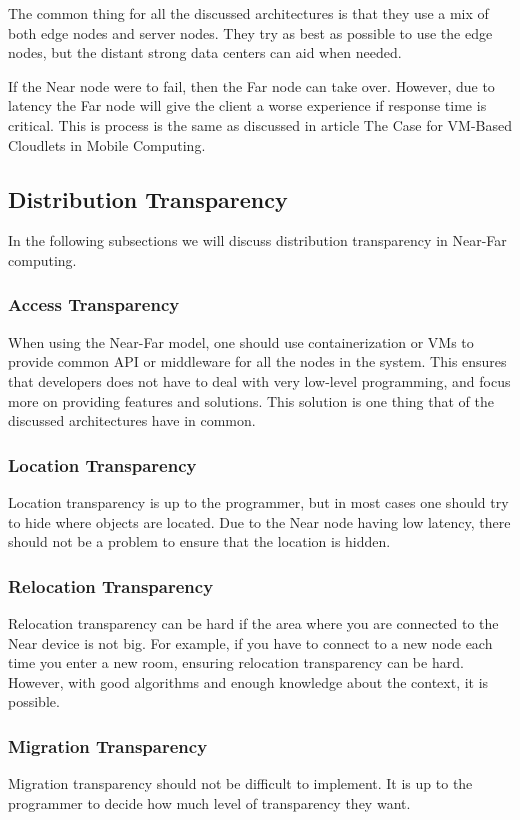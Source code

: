 The common thing for all the discussed architectures is that they use a mix of both edge nodes and server nodes. They try as best as possible to use the edge nodes, but the distant strong data centers can aid when needed. 

If the Near node were to fail, then the Far node can take over. However, due to latency the Far node will give the client a worse experience if response time is critical. This is process is the same as discussed in article The Case for VM-Based Cloudlets in Mobile Computing\cite{satyanarayanan_case_2009}.

\subsection{Distribution Transparency}
In the following subsections we will discuss distribution transparency in Near-Far computing.

\subsubsection{Access Transparency}
When using the Near-Far model, one should use containerization or VMs to provide common API or middleware for all the nodes in the system. This ensures that developers does not have to deal with very low-level programming, and focus more on providing features and solutions. This solution is one thing that of the discussed architectures have in common.

\subsubsection{Location Transparency}
Location transparency is up to the programmer, but in most cases one should try to hide where objects are located. Due to the Near node having low latency, there should not be a problem to ensure that the location is hidden.

\subsubsection{Relocation Transparency}
Relocation transparency can be hard if the area where you are connected to the Near device is not big. For example, if you have to connect to a new node each time you enter a new room, ensuring relocation transparency can be hard. However, with good algorithms and enough knowledge about the context, it is possible. 

\subsubsection{Migration Transparency}
Migration transparency should not be difficult to implement. It is up to the programmer to decide how much level of transparency they want. 

